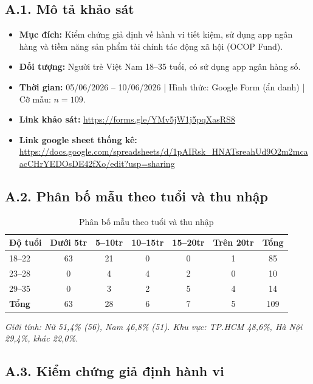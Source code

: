 \documentclass[13pt,a4paper]{extarticle}
\begin{document}
\subsection*{A.1. Mô tả khảo sát}

\begin{itemize}
    \item \textbf{Mục đích:} Kiểm chứng giả định về hành vi tiết kiệm, sử dụng app ngân hàng và tiềm năng sản phẩm tài chính tác động xã hội (OCOP Fund).
    \item \textbf{Đối tượng:} Người trẻ Việt Nam 18--35 tuổi, có sử dụng app ngân hàng số.
    \item \textbf{Thời gian:} 05/06/2026 -- 10/06/2026 | Hình thức: Google Form (ẩn danh) | Cỡ mẫu: $n = 109$.
    \item \textbf{Link khảo sát:} \url{https://forms.gle/YMv5jW1j5pqXasRS8}
    \item \textbf{Link google sheet thống kê:} \url{https://docs.google.com/spreadsheets/d/1pAIRsk_HNATsreahUd9O2m2mcaacCHrYEDOsDE42fXo/edit?usp=sharing}
\end{itemize}

\subsection*{A.2. Phân bố mẫu theo tuổi và thu nhập}

\begin{table}[H]
\centering
\caption{Phân bố mẫu theo tuổi và thu nhập}
\begin{tabular}{|l|c|c|c|c|c|c|}
\hline
\textbf{Độ tuổi} & \textbf{Dưới 5tr} & \textbf{5--10tr} & \textbf{10--15tr} & \textbf{15--20tr} & \textbf{Trên 20tr} & \textbf{Tổng} \\
\hline
18--22 & 63 & 21 & 0 & 0 & 1 & 85 \\
\hline
23--28 & 0 & 4 & 4 & 2 & 0 & 10 \\
\hline
29--35 & 0 & 3 & 2 & 5 & 4 & 14 \\
\hline
\textbf{Tổng} & 63 & 28 & 6 & 7 & 5 & 109 \\
\hline
\end{tabular}
\end{table}

\textit{Giới tính: Nữ 51,4\% (56), Nam 46,8\% (51). Khu vực: TP.HCM 48,6\%, Hà Nội 29,4\%, khác 22,0\%.}

\subsection*{A.3. Kiểm chứng giả định hành vi}
\end{document}
